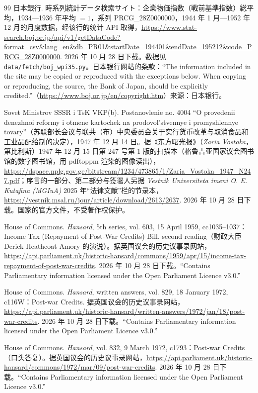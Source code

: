 \begin{thebibliography}{99}
 日本銀行. 時系列統計データ検索サイト：企業物価指数（戦前基準指数）総平均，1934—1936 年平均 $=1$，系列 PRCG\_28Z0000000，1944 年 1 月—1952 年 12 月的月度数据，经该行的统计 API 取得，\url{https://www.stat-search.boj.or.jp/api/v1/getDataCode?format=csv&lang=en&db=PR01&startDate=194401&endDate=195212&code=PRCG_28Z0000000}. 2026 年 10 月 28 日下载。数据见 \texttt{data/fetch/boj\_wpi35.py}。日本银行网站的条款：“The information included in the site may be copied or reproduced with the exceptions below. When copying or reproducing, the source, the Bank of Japan, should be explicitly credited.”（\url{https://www.boj.or.jp/en/copyright.htm}）来源：日本银行。

 Sovet Ministrov SSSR i TsK VKP(b). Postanovlenie no. 4004 “O provedenii denezhnoi reformy i otmene kartochek na prodovol'stvennye i promyshlennye tovary”（苏联部长会议与联共（布）中央委员会关于实行货币改革与取消食品和工业品配给制的决定），1947 年 12 月 14 日。据《东方曙光报》（\emph{Zaria Vostoka}，第比利斯）1947 年 12 月 15 日第 247 号第 1 版的扫描本（格鲁吉亚国家议会图书馆的数字图书馆，用 pdftoppm 渲染的图像读出），\url{https://dspace.nplg.gov.ge/bitstream/1234/473865/1/Zaria_Vostoka_1947_N247.pdf}；序言的一部分、第二部分与签署人另据 \emph{Vestnik Universiteta imeni O. E. Kutafina (MGIuA)} 2025 年“法律文献”栏的节录本，\url{https://vestnik.msal.ru/jour/article/download/2613/2637}. 2026 年 10 月 28 日下载。国家的官方文件，不受著作权保护。

 House of Commons. \emph{Hansard}, 5th series, vol. 603, 15 April 1959, cc1035--1037：Income Tax (Repayment of Post-War Credits) Bill, second reading（财政大臣 Derick Heathcoat Amory 的演说）。据英国议会的历史议事录网站，\url{https://api.parliament.uk/historic-hansard/commons/1959/apr/15/income-tax-repayment-of-post-war-credits}. 2026 年 10 月 28 日下载。“Contains Parliamentary information licensed under the Open Parliament Licence v3.0.”

 House of Commons. \emph{Hansard}, written answers, vol. 829, 18 January 1972, c116W：Post-war Credits. 据英国议会的历史议事录网站，\url{https://api.parliament.uk/historic-hansard/written-answers/1972/jan/18/post-war-credits}. 2026 年 10 月 28 日下载。“Contains Parliamentary information licensed under the Open Parliament Licence v3.0.”

 House of Commons. \emph{Hansard}, vol. 832, 9 March 1972, c1793：Post-war Credits（口头答复）。据英国议会的历史议事录网站，\url{https://api.parliament.uk/historic-hansard/commons/1972/mar/09/post-war-credits}. 2026 年 10 月 28 日下载。“Contains Parliamentary information licensed under the Open Parliament Licence v3.0.”


\end{thebibliography}
